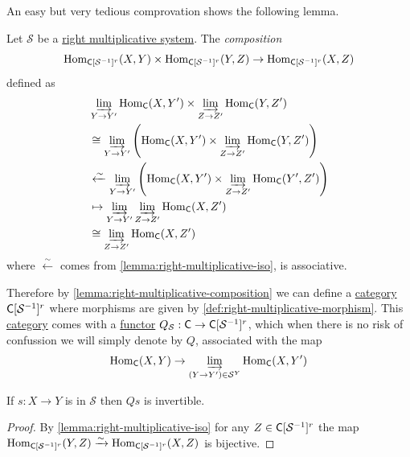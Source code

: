 \documentclass[../../main]{subfiles}
\begin{document}
An easy but very tedious comprovation shows the following lemma.
\begin{lemma}\label{lemma:right-multiplicative-composition}
  Let \(\mathcal{S}\) be a \hyperref[def:multiplicative-system]{right multiplicative system}.
  The \textit{composition}
  \begin{equation*}
    \operatorname{Hom}_{\mathsf{C}[\mathcal{S}^{-1}]^{r}}(X, Y) \times \operatorname{Hom}_{\mathsf{C}[\mathcal{S}^{-1}]^{r}}(Y, Z) \to \operatorname{Hom}_{\mathsf{C}[\mathcal{S}^{-1}]^{r}}(X, Z)
  \end{equation*}
  defined as
  \begin{align*}
    &\varinjlim_{Y \to Y'} \operatorname{Hom}_{\mathsf{C}}(X, Y') \times \varinjlim_{Z \to Z'} \operatorname{Hom}_{\mathsf{C}}(Y, Z') \\
    &\cong \varinjlim_{Y \to Y'} \left( \operatorname{Hom}_{\mathsf{C}}(X, Y') \times \varinjlim_{Z \to Z'} \operatorname{Hom}_{\mathsf{C}}(Y, Z') \right) \\
    &\xleftarrow{\sim} \varinjlim_{Y \to Y'} \left( \operatorname{Hom}_{\mathsf{C}}(X, Y') \times \varinjlim_{Z \to Z'} \operatorname{Hom}_{\mathsf{C}}(Y', Z') \right) \\
    &\mapsto \varinjlim_{Y \to Y'}\varinjlim_{Z \to Z'} \operatorname{Hom}_{\mathsf{C}}(X, Z') \\
    &\cong \varinjlim_{Z \to Z'} \operatorname{Hom}_{\mathsf{C}}(X, Z')
  \end{align*}
  where \(\xleftarrow{\sim}\) comes from \autoref{lemma:right-multiplicative-iso}, is associative.
\end{lemma}

Therefore by \autoref{lemma:right-multiplicative-composition} we can define a \hyperref[def:category]{category} \(\mathsf{C}[\mathcal{S}^{-1}]^{r}\) where morphisms are given by \autoref{def:right-multiplicative-morphism}.
This \hyperref[def:category]{category} comes with a \hyperref[def:functor]{functor} \(Q_{\mathcal{S}}: \mathsf{C} \to \mathsf{C}[\mathcal{S}^{-1}]^{r}\), which when there is no risk of confussion we will simply denote by \(Q\), associated with the map
\begin{equation*}
  \operatorname{Hom}_{\mathsf{C}}(X, Y) \to \varinjlim_{(Y \to Y') \in \mathcal{S}^{Y}} \operatorname{Hom}_{\mathsf{C}}(X, Y')
\end{equation*}

\begin{lemma}
  If \(s: X \to Y\) is in \(\mathcal{S}\) then \(Qs\) is invertible.
\end{lemma}
\begin{proof}
  By \autoref{lemma:right-multiplicative-iso} for any \(Z \in \mathsf{C}[\mathcal{S}^{-1}]^{r}\) the map \(\operatorname{Hom}_{\mathsf{C}[\mathcal{S}^{-1}]^{r}}(Y, Z) \xrightarrow{\sim} \operatorname{Hom}_{\mathsf{C}[\mathcal{S}^{-1}]^{r}}(X, Z)\) is bijective.
\end{proof}
\end{document}
